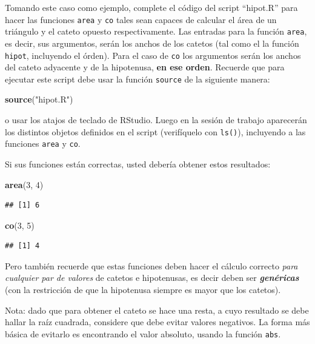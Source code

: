\documentclass[]{article}
\newenvironment{Shaded}{}{}
\newcommand{\KeywordTok}[1]{\textcolor[rgb]{0.00,0.44,0.13}{\textbf{{#1}}}}
\newcommand{\DecValTok}[1]{\textcolor[rgb]{0.25,0.63,0.44}{{#1}}}
\newcommand{\StringTok}[1]{\textcolor[rgb]{0.25,0.44,0.63}{{#1}}}
\newcommand{\NormalTok}[1]{{#1}}
\begin{document}
Tomando este caso como ejemplo, complete el código del script
``hipot.R'' para hacer las funciones \texttt{area} y \texttt{co} tales
sean capaces de calcular el área de un triángulo y el cateto opuesto
respectivamente. Las entradas para la función \texttt{area}, es decir,
sus argumentos, serán los anchos de los catetos (tal como el la función
\texttt{hipot}, incluyendo el órden). Para el caso de \texttt{co} los
argumentos serán los anchos del cateto adyacente y de la hipotenusa,
\textbf{en ese orden}. Recuerde que para ejecutar este script debe usar
la función \texttt{source} de la siguiente manera:

\begin{Shaded}
\begin{Highlighting}[]
\KeywordTok{source}\NormalTok{(}\StringTok{"hipot.R"}\NormalTok{)}
\end{Highlighting}
\end{Shaded}
o usar los atajos de teclado de RStudio. Luego en la sesión de trabajo
aparecerán los distintos objetos definidos en el script (verifíquelo con
\texttt{ls()}), incluyendo a las funciones \texttt{area} y \texttt{co}.

Si sus funciones están correctas, usted debería obtener estos
resultados:

\begin{Shaded}
\begin{Highlighting}[]
\KeywordTok{area}\NormalTok{(}\DecValTok{3}\NormalTok{, }\DecValTok{4}\NormalTok{)}
\end{Highlighting}
\end{Shaded}
\begin{verbatim}
## [1] 6
\end{verbatim}
\begin{Shaded}
\begin{Highlighting}[]
\KeywordTok{co}\NormalTok{(}\DecValTok{3}\NormalTok{, }\DecValTok{5}\NormalTok{)}
\end{Highlighting}
\end{Shaded}
\begin{verbatim}
## [1] 4
\end{verbatim}
Pero también recuerde que estas funciones deben hacer el cálculo
correcto \emph{para cualquier par de valores} de catetos e hipotenusas,
es decir deben ser \emph{\textbf{genéricas}} (con la restricción de que
la hipotenusa siempre es mayor que los catetos).

Nota: dado que para obtener el cateto se hace una resta, a cuyo
resultado se debe hallar la raíz cuadrada, considere que debe evitar
valores negativos. La forma más básica de evitarlo es encontrando el
valor absoluto, usando la función \texttt{abs}.
\end{document}
